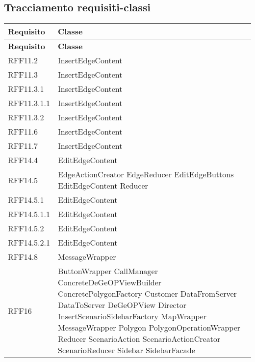 	
	\newpage
	
	\subsection{Tracciamento requisiti-classi}
	
	\def\arraystretch{1.5}
	\begin{longtable}{p{2.5cm}!{\VRule[1pt]}p{5cm}}
		\color{white} \textbf{Requisito} & \color{white} \textbf{Classe} \\ 
		\endfirsthead
		\color{white} \textbf{Requisito} & \color{white} \textbf{Classe} \\ 
		\endhead
		RFF11.2 & InsertEdgeContent\\
		RFF11.3 & InsertEdgeContent\\
		RFF11.3.1 & InsertEdgeContent\\
		RFF11.3.1.1 & InsertEdgeContent\\
		RFF11.3.2 & InsertEdgeContent\\
		RFF11.6 & InsertEdgeContent\\
		RFF11.7 & InsertEdgeContent\\
		RFF14.4 & EditEdgeContent\\
		RFF14.5 & EdgeActionCreator \newline EdgeReducer \newline EditEdgeButtons \newline EditEdgeContent \newline Reducer\\
		RFF14.5.1 & EditEdgeContent\\
		RFF14.5.1.1 & EditEdgeContent\\
		RFF14.5.2 & EditEdgeContent\\
		RFF14.5.2.1 & EditEdgeContent\\
		RFF14.8 & MessageWrapper\\
		RFF16 & ButtonWrapper \newline CallManager \newline ConcreteDeGeOPViewBuilder \newline ConcretePolygonFactory \newline Customer \newline DataFromServer \newline DataToServer \newline DeGeOPView \newline Director \newline InsertScenarioSidebarFactory \newline MapWrapper \newline MessageWrapper \newline Polygon \newline PolygonOperationWrapper \newline Reducer \newline ScenarioAction \newline ScenarioActionCreator \newline ScenarioReducer \newline Sidebar \newline SidebarFacade\\

\end{longtable}
